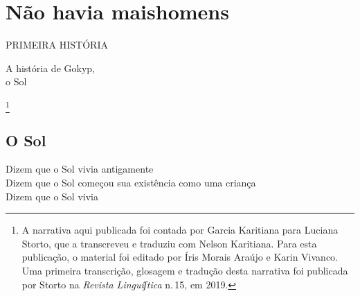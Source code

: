 \part[Não havia mais homens]{Não havia mais\break homens}


\pagebreak
\thispagestyle{empty}
\mbox{}
\begin{center}
\vspace{4cm}
{\formularlight\small PRIMEIRA HISTÓRIA}

\medskip

{\formular\huge A história de Gokyp,\\\vspace{0.2cm} o Sol}
\end{center}
\pagebreak


\thispagestyle{empty}
\mbox{}
\vfill
\noindent{}\footnote{A narrativa aqui publicada foi contada por Garcia Karitiana para Luciana Storto, que a transcreveu e traduziu com Nelson Karitiana. Para esta publicação, o material foi editado por Íris Morais Araújo e Karin Vivanco. Uma primeira transcrição, glosagem e tradução desta narrativa foi publicada por Storto na \emph{Revista Linguíʃtica} n.\,15, em 2019.}
\pagebreak


\chapter*{O Sol}

\begin{linenumbers}\begingroup\raggedright
\noindent Dizem que o Sol vivia antigamente\\
Dizem que o Sol começou sua existência como uma criança\\
Dizem que o Sol vivia
\end{linenumbers}\endgroup

